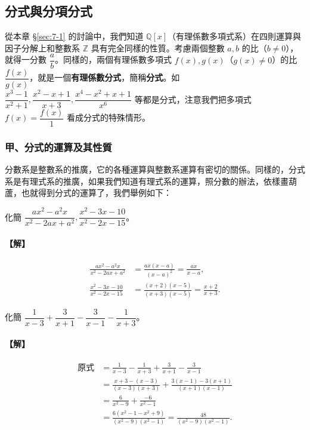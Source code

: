 \subsection{分式與分項分式}\label{sec:7-3}

從本章 \S\ref{sec:7-1} 的討論中，我們知道 $\mathbb{Q}[x]$（有理係數多項式系）在四則運算與因子分解上和整數系 $\mathbb{Z}$ 具有完全同樣的性質。考慮兩個整數 $a, b$ 的比（$b \neq 0$），就得一分數 $\dfrac{a}{b}$。同樣的，兩個有理係數多項式 $f(x), g(x)$（$g(x) \neq 0$）的比 $\dfrac{f(x)}{g(x)}$，就是一個\textbf{有理係數分式}，簡稱\textbf{分式}。如 $\dfrac{x^3-1}{x^2+1}, \dfrac{x^2-x+1}{x+3}, \dfrac{x^4-x^2+x+1}{x^6}$ 等都是分式，注意我們把多項式 $f(x) = \dfrac{f(x)}{1}$ 看成分式的特殊情形。

\subsubsection*{甲、分式的運算及其性質}\label{subsec:7-3-a}

分數系是整數系的推廣，它的各種運算與整數系運算有密切的關係。同樣的，分式系是有理式系的推廣，如果我們知道有理式系的運算，照分數的辦法，依樣畫葫蘆，也就得到分式的運算了，我們舉例如下：

\begin{example}\label{ex:7-3-1}
化簡 $\dfrac{ax^2-a^2 x}{x^2-2ax+a^2}, \dfrac{x^2-3x-10}{x^2-2x-15}$。

\paragraph{【解】}
\begin{align*}
  \frac{ax^2-a^2 x}{x^2-2ax+a^2} &= \frac{ax(x-a)}{(x-a)^2} = \frac{ax}{x-a}, \\
  \frac{x^2-3x-10}{x^2-2x-15} &= \frac{(x+2)(x-5)}{(x+3)(x-5)} = \frac{x+2}{x+3}.
\end{align*}
\end{example}

\begin{example}\label{ex:7-3-2}
化簡 $\dfrac{1}{x-3} + \dfrac{3}{x+1} - \dfrac{3}{x-1} - \dfrac{1}{x+3}$。

\paragraph{【解】}
\begin{align*}
  \text{原式} &= \frac{1}{x-3} - \frac{1}{x+3} + \frac{3}{x+1} - \frac{3}{x-1} \\
  &= \frac{x+3-(x-3)}{(x-3)(x+3)} + \frac{3(x-1)-3(x+1)}{(x+1)(x-1)} \\
  &= \frac{6}{x^2-9} + \frac{-6}{x^2-1} \\
  &= \frac{6(x^2-1-x^2+9)}{(x^2-9)(x^2-1)} = \frac{48}{(x^2-9)(x^2-1)}.
\end{align*}
\end{example}

